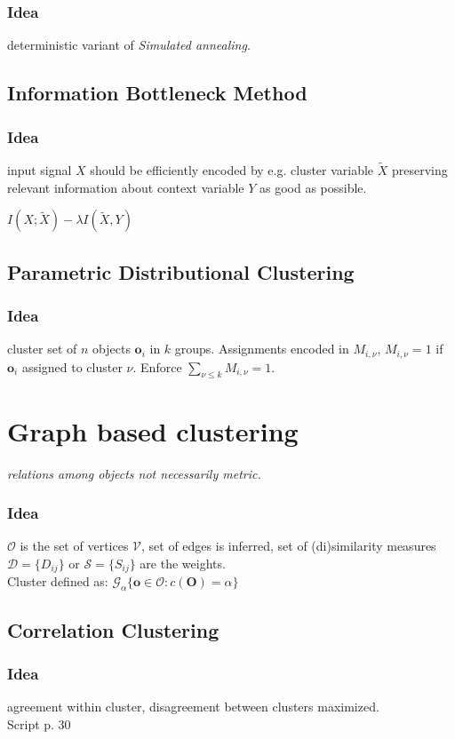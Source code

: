 \documentclass[9pt,parskip]{scrartcl}
\begin{document}
\begin{multicols*}{4}
\subsubsection*{Idea}
deterministic variant of \textit{Simulated annealing}.

\subsection*{Information Bottleneck Method}
\subsubsection*{Idea}
input signal $X$ should be efficiently encoded by e.g. cluster variable $\tilde{X}$ preserving relevant information about context variable $Y$ as good as possible.

$ I(X; \tilde{X}) - \lambda I(\tilde{X}, Y)$

\subsection*{Parametric Distributional Clustering}
\subsubsection*{Idea}
cluster set of $n$ objects $\mathbf{o}_i$ in $k$ groups. Assignments encoded in $M_{i, \nu}$, $M_{i, \nu} = 1$ if $\mathbf{o}_i$ assigned to cluster $\nu$. Enforce $\sum_{\nu \leq k} M_{i, \nu} = 1$.

\section*{Graph based clustering}
\textit{relations among objects not necessarily metric.}
\subsubsection*{Idea}
$\mathcal{O}$ is the set of vertices $\mathcal{V}$, set of edges is inferred, set of (di)similarity measures $\mathcal{D}=\{D_{ij}\}$ or $\mathcal{S}=\{S_{ij}\}$ are the weights. \\
Cluster defined as: $\mathcal{G}_{\alpha} \{ \mathbf{o} \in \mathcal{O} : c( \mathbf{O}) = \alpha\}$
\subsection*{Correlation Clustering}
\subsubsection*{Idea}
agreement within cluster, disagreement between clusters maximized. \\
Script p. 30

\end{multicols*}
\end{document}
